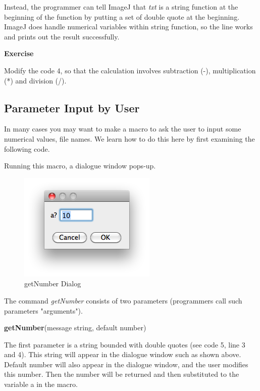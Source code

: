 \documentclass[11pt,a4paper,oneside]{report}
\newenvironment{indentexercise}[1]%
{{\setlength{\leftmargin}{2em}}%
\textbf{Exercise \thesubsection-#1}%
\begin{list}{}%
	\item%
}
{\end{list}}
\newenvironment{indentCom}%
{\begin{list}{}%
         {\setlength{\leftmargin}{1em}}%
         \item[]%
}
{\end{list}}
\begin{document}
Instead, the programmer can tell ImageJ that 
\textit{txt} is a string function at the beginning of the function 
by putting a set of double quote at the beginning. 
ImageJ does handle numerical variables within string function, 
so the line works and prints out the result successfully.  

\begin{indentexercise}{2}
Modify the code 4, so that the calculation involves subtraction (-), multiplication (*) and division (/). 
\end{indentexercise}

\subsection{Parameter Input by User}
In many cases you may want to make a macro to ask the user to input some numerical values, 
file names. We learn how to do this here by first examining the following code. 

Running this macro,  a dialogue window pops-up.

\begin{figure}[htbp]
\begin{center}
\includegraphics[scale=0.6]{fig/getNumberDialog.png}
\caption{getNumber Dialog} \label{fig_getNUmber}
\end{center}
\end{figure}

The command \textit{getNumber} consists of two parameters (programmers call such parameters "arguments").
\begin{indentCom}
\textbf{getNumber}(message string, default number)
\end{indentCom}
The first parameter is a string bounded with double quotes (see code 5, line 3 and 4). 
This string will appear in the dialogue window such as shown above. 
Default number will also appear in the dialogue window, 
and the user modifies this number. 
Then the number will be returned and then substituted to the variable a in the macro. 
\end{document}
